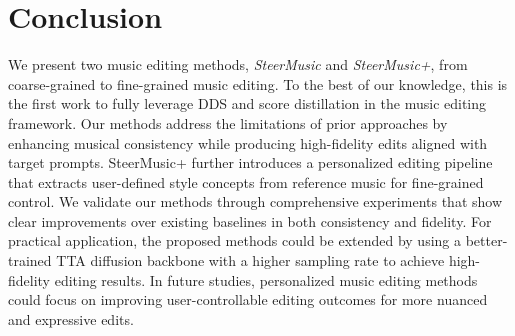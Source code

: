 \section{Conclusion}
We present two music editing methods, \textit{SteerMusic} and \textit{SteerMusic+}, from coarse-grained to fine-grained music editing. To the best of our knowledge, this is the first work to fully leverage DDS and score distillation in the music editing framework. Our methods address the limitations of prior approaches by enhancing musical consistency while producing high-fidelity edits aligned with target prompts. SteerMusic+ further introduces a personalized editing pipeline that extracts user-defined style concepts from reference music for fine-grained control. We validate our methods through comprehensive experiments that show clear improvements over existing baselines in both consistency and fidelity. For practical application, the proposed methods could be extended by using a better-trained TTA diffusion backbone with a higher sampling rate to achieve high-fidelity editing results. In future studies, personalized music editing methods could focus on improving user-controllable editing outcomes for more nuanced and expressive edits.
